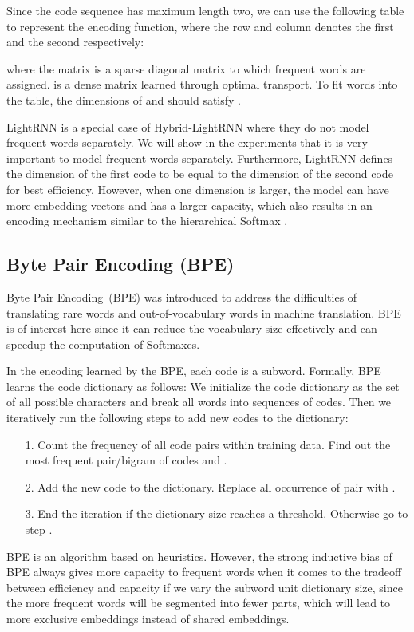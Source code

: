 \documentclass[letterpaper]{article} \usepackage{aaai19}  \usepackage{times}  \usepackage{helvet}  \usepackage{courier}  \usepackage{url}  \usepackage{graphicx}  \frenchspacing  \usepackage{booktabs}
\begin{document}
Since the code sequence has maximum length two, we can use the following table to represent the encoding function, where the row and column denotes the first and the second respectively:

where the matrix  is a sparse diagonal matrix to which frequent words are assigned.  
 is a dense matrix learned through optimal transport.
To fit  words into the table, the dimensions of  and  should satisfy . 


LightRNN \cite{li2016lightrnn} is a special case of Hybrid-LightRNN where they do not  model frequent words separately. We will show in the experiments that it is very important to model frequent words separately. Furthermore, LightRNN defines the dimension of the first code to be equal to the dimension of the second code  for best efficiency. However, when one dimension is larger, the model can have more embedding vectors and has a larger capacity, which also results in an encoding mechanism similar to the hierarchical Softmax \cite{morin2005hierarchical}.

\subsection{Byte Pair Encoding (BPE)}
\label{sec:bpe}
Byte Pair Encoding~(BPE) \cite{gage1994new,sennrich2016neural} was introduced to address the difficulties of translating rare words and out-of-vocabulary words in machine translation. BPE is of interest here since it can reduce the vocabulary size effectively and can speedup the computation of Softmaxes. 
 

In the encoding learned by the BPE, each code is a subword. 
Formally, BPE learns the code dictionary  as follows: We initialize the code dictionary as the set of all possible characters and break all words into sequences of codes. Then we iteratively run the following steps to add new codes to the dictionary:
\begin{itemize}
	\item[1.] Count the frequency of all code pairs within training data. Find out the most frequent pair/bigram of codes  and .
	\item[2.] Add the new code  to the dictionary. Replace all occurrence of pair  with .
	\item[3.] End the iteration if the dictionary size reaches a threshold. Otherwise go to step .
\end{itemize}


BPE is an algorithm based on heuristics. However, the strong inductive bias of BPE always gives more capacity to frequent words when it comes to the tradeoff between efficiency and capacity if we vary the subword unit dictionary size, since the more frequent words will be segmented into fewer parts, which will lead to more exclusive embeddings instead of shared embeddings. 
\end{document}

